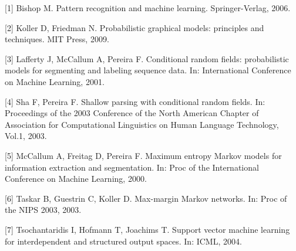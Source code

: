\documentclass[UTF8, 12pt, fontset=fandol, oneside]{ctexart}
\begin{document}
[1] Bishop M. Pattern recognition and machine learning. Springer-Verlag, 2006.

[2] Koller D, Friedman N. Probabilistic graphical models: principles and techniques. MIT Press, 2009.

[3] Lafferty J, McCallum A, Pereira F. Conditional random fields: probabilistic models for segmenting and labeling sequence data. In: International Conference on Machine Learning, 2001.

[4] Sha F, Pereira F. Shallow parsing with conditional random fields. In: Proceedings of the 2003 Conference of the North American Chapter of Association for Computational Linguistics on Human Language Technology, Vol.1, 2003.

[5] McCallum A, Freitag D, Pereira F. Maximum entropy Markov models for information extraction and segmentation. In: Proc of the International Conference on Machine Learning, 2000.

[6] Taskar B, Guestrin C, Koller D. Max-margin Markov networks. In: Proc of the NIPS 2003, 2003.

[7] Tsochantaridis I, Hofmann T, Joachims T. Support vector machine learning for interdependent and structured output spaces. In: ICML, 2004.
\end{document}

